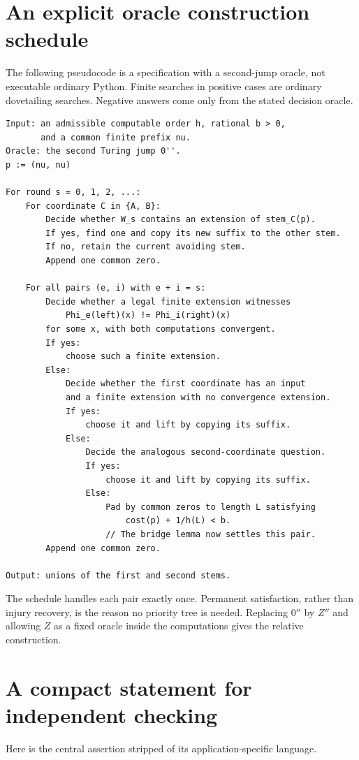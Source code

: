 \documentclass[11pt,a4paper]{article}
\theoremstyle{definition}
\theoremstyle{remark}
\begin{document}
\section{An explicit oracle construction schedule}\label{app:pseudocode}
The following pseudocode is a specification with a second-jump oracle, not executable ordinary Python. Finite searches in positive cases are ordinary dovetailing searches. Negative answers come only from the stated decision oracle.
\begin{lstlisting}
Input: an admissible computable order h, rational b > 0,
       and a common finite prefix nu.
Oracle: the second Turing jump 0''.
p := (nu, nu)

For round s = 0, 1, 2, ...:
    For coordinate C in {A, B}:
        Decide whether W_s contains an extension of stem_C(p).
        If yes, find one and copy its new suffix to the other stem.
        If no, retain the current avoiding stem.
        Append one common zero.

    For all pairs (e, i) with e + i = s:
        Decide whether a legal finite extension witnesses
            Phi_e(left)(x) != Phi_i(right)(x)
        for some x, with both computations convergent.
        If yes:
            choose such a finite extension.
        Else:
            Decide whether the first coordinate has an input
            and a finite extension with no convergence extension.
            If yes:
                choose it and lift by copying its suffix.
            Else:
                Decide the analogous second-coordinate question.
                If yes:
                    choose it and lift by copying its suffix.
                Else:
                    Pad by common zeros to length L satisfying
                        cost(p) + 1/h(L) < b.
                    // The bridge lemma now settles this pair.
        Append one common zero.

Output: unions of the first and second stems.
\end{lstlisting}
The schedule handles each pair exactly once. Permanent satisfaction, rather than injury recovery, is the reason no priority tree is needed. Replacing $0''$ by $Z''$ and allowing $Z$ as a fixed oracle inside the computations gives the relative construction.

\section{A compact statement for independent checking}\label{app:certificate}
Here is the central assertion stripped of its application-specific language.
\end{document}

